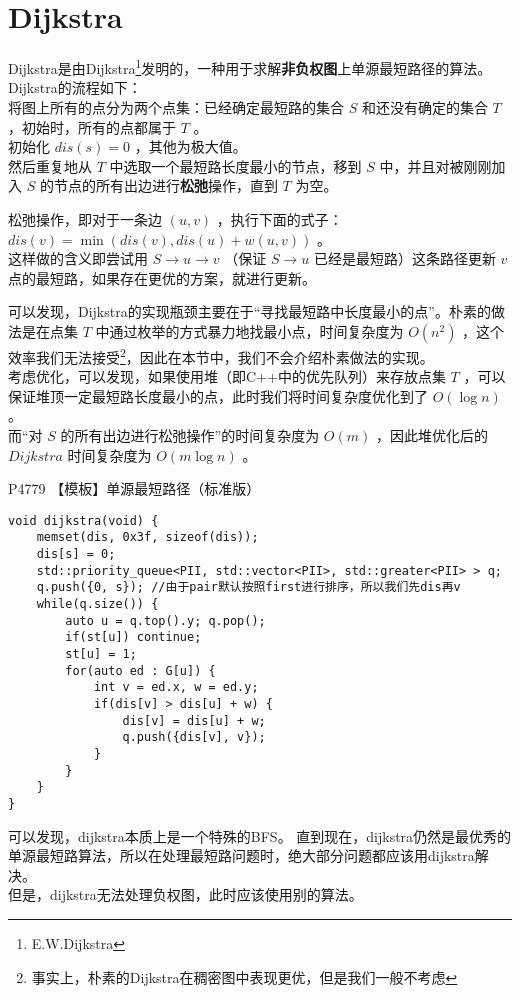 \documentclass{beamer}
\newcommand{\fdf}[1]{\alert{\textbf{#1}}}
\begin{document}
\section{Dijkstra}
\begin{frame}
Dijkstra是由Dijkstra\footnote{E.W.Dijkstra}发明的，一种用于求解\fdf{非负权图}上单源最短路径的算法。\\ 
Dijkstra的流程如下：\\ 
将图上所有的点分为两个点集：已经确定最短路的集合 $S$ 和还没有确定的集合 $T$ ，初始时，所有的点都属于 $T$ 。 \\ 
初始化 $dis(s) = 0$ ，其他为极大值。\\ 
然后重复地从 $T$ 中选取一个最短路长度最小的节点，移到 $S$ 中，并且对被刚刚加入 $S$ 的节点的所有出边进行\fdf{松弛}操作，直到 $T$ 为空。\\ 
\end{frame}
\begin{frame}
松弛操作，即对于一条边 $(u, v)$ ，执行下面的式子：$dis(v) = \min(dis(v), dis(u) + w(u, v))$ 。\\
这样做的含义即尝试用 $S \rightarrow u \rightarrow v$ （保证 $S \rightarrow u$ 已经是最短路）这条路径更新 $v$ 点的最短路，如果存在更优的方案，就进行更新。
\end{frame}
\begin{frame}
可以发现，Dijkstra的实现瓶颈主要在于“寻找最短路中长度最小的点”。朴素的做法是在点集 $T$ 中通过枚举的方式暴力地找最小点，时间复杂度为 $O(n^2)$ ，这个效率我们无法接受\footnote{事实上，朴素的Dijkstra在稠密图中表现更优，但是我们一般不考虑}，因此在本节中，我们不会介绍朴素做法的实现。 \\ 
考虑优化，可以发现，如果使用堆（即C++中的优先队列）来存放点集 $T$ ，可以保证堆顶一定最短路长度最小的点，此时我们将时间复杂度优化到了 $O(\log n)$ 。\\
而“对 $S$ 的所有出边进行松弛操作”的时间复杂度为 $O(m)$ ，因此堆优化后的 $Dijkstra$ 时间复杂度为 $O(m \log n)$ 。
\end{frame}
\begin{frame}[fragile]
P4779 【模板】单源最短路径（标准版）\\ 
\begin{onlyenv}
\begin{verbatim}
void dijkstra(void) {
    memset(dis, 0x3f, sizeof(dis));
    dis[s] = 0;
    std::priority_queue<PII, std::vector<PII>, std::greater<PII> > q;
    q.push({0, s}); //由于pair默认按照first进行排序，所以我们先dis再v
    while(q.size()) {
        auto u = q.top().y; q.pop();
        if(st[u]) continue;
        st[u] = 1;
        for(auto ed : G[u]) {
            int v = ed.x, w = ed.y;
            if(dis[v] > dis[u] + w) {
                dis[v] = dis[u] + w;
                q.push({dis[v], v});
            }
        }
    }
}
\end{verbatim}
\end{onlyenv}
\end{frame}
\begin{frame}
可以发现，dijkstra本质上是一个特殊的BFS。
直到现在，dijkstra仍然是最优秀的单源最短路算法，所以在处理最短路问题时，绝大部分问题都应该用dijkstra解决。\\ 
但是，dijkstra无法处理负权图，此时应该使用别的算法。
\end{frame}
\end{document}
